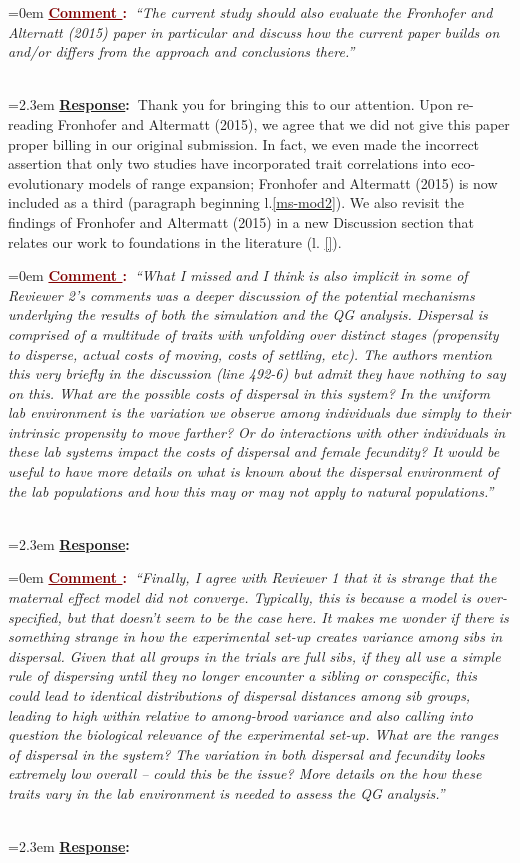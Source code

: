 \documentclass[12pt]{article}
\newcounter{cN}
\newcommand{\comment}[1]{
	\vspace{2em}
	\refstepcounter{cN} %
	\noindent \hangindent=0em \textbf{\textcolor{Maroon}{\uline{Comment \thecN}:~}}\emph{``#1''}
	}
\newcommand{\response}[1]{
	\\[0.25em]
	\hangindent=2.3em \textbf{\textcolor{NavyBlue}{\uline{Response}:~}}#1
	}
\begin{document}
\comment{The current study should also evaluate the Fronhofer and Alternatt (2015) paper in particular and discuss how the current paper builds on and/or differs from the approach and conclusions there.}
\response{Thank you for bringing this to our attention. Upon re-reading Fronhofer and Altermatt (2015), we agree that we did not give this paper proper billing in our original submission.
In fact, we even made the incorrect assertion that only two studies have incorporated trait correlations into eco-evolutionary models of range expansion; Fronhofer and Altermatt (2015) is now included as a third (paragraph beginning l.\ref{ms-mod2}).
We also revisit the findings of Fronhofer and Altermatt (2015) in a new Discussion section that relates our work to foundations in the literature (l. \ref{}).}

\comment{What I missed and I think is also implicit in some of Reviewer 2’s comments was a deeper discussion of the potential mechanisms underlying the results of both the simulation and the QG analysis.
Dispersal is comprised of a multitude of traits with unfolding over distinct stages (propensity to disperse, actual costs of moving, costs of settling, etc).
The authors mention this very briefly in the discussion (line 492-6) but admit they have nothing to say on this.
What are the possible costs of dispersal in this system?
In the uniform lab environment is the variation we observe among individuals due simply to their intrinsic propensity to move farther?
Or do interactions with other individuals in these lab systems impact the costs of dispersal and female fecundity?
It would be useful to have more details on what is known about the dispersal environment of the lab populations and how this may or may not apply to natural populations.}
\response{}

\comment{Finally, I agree with Reviewer 1 that it is strange that the maternal effect model did not converge.
Typically, this is because a model is over-specified, but that doesn’t seem to be the case here.
It makes me wonder if there is something strange in how the experimental set-up creates variance among sibs in dispersal.
Given that all groups in the trials are full sibs, if they all use a simple rule of dispersing until they no longer encounter a sibling or conspecific, this could lead to identical distributions of dispersal distances among sib groups, leading to high within relative to among-brood variance and also calling into question the biological relevance of the experimental set-up.
What are the ranges of dispersal in the system? The variation in both dispersal and fecundity looks extremely low overall – could this be the issue?
More details on the how these traits vary in the lab environment is needed to assess the QG analysis.}
\response{}
\end{document}
